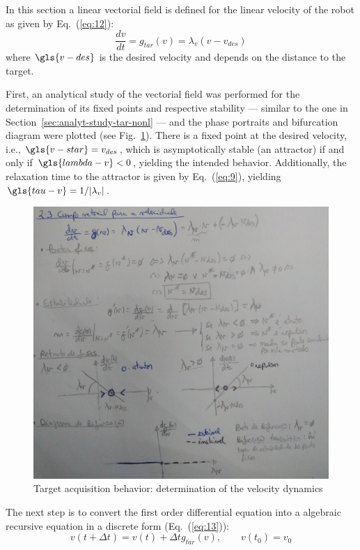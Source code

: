 In this section a linear vectorial field is defined for the linear velocity of
the robot as given by Eq.~(\ref{eq:12}):
%
\begin{equation}
  \label{eq:12}
\frac{dv}{dt} = g_{tar} (v) = \lambda_v (v - v_{des})
\end{equation}
%
where $\gls{v-des}$ is the desired velocity and depends on the distance to the
target.

First, an analytical study of the vectorial field was performed for the
determination of its fixed points and respective stability --- similar to the
one in Section~\ref{sec:analyt-study-tar-nonl} ---  and the phase
portraits and bifurcation diagram were plotted (see
Fig.~\ref{fig:2-3-velocity-vectorial-field}). There is a fixed point at the
desired velocity, i.e., $\gls{v-star} = v_{des}$, which is asymptotically stable (an
attractor) if and only if $\gls{lambda-v} < 0$, yielding the intended
behavior. Additionally, the relaxation time to the attractor is given by
Eq.~(\ref{eq:9}), yielding $\gls{tau-v} = 1 / |\lambda_v| $.
%
\begin{figure}[!hbt]
\centering
    \includegraphics[width=\textwidth]{./img/2-3-velocity-vectorial-field.jpg}
  \caption{Target acquisition behavior: determination of the velocity dynamics}%
\label{fig:2-3-velocity-vectorial-field}
\end{figure}
%

The next step is to convert the first order differential equation into a
algebraic recursive equation in a discrete form (Eq.~(\ref{eq:13})):
\begin{equation}
  \label{eq:13}
v(t + \Delta t) = v(t) + \Delta t g_{tar}(v), \qquad v(t_0) = v_0
\end{equation}

